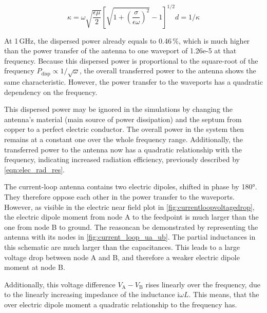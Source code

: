 \begin{subequations}
	\begin{equation}
		\kappa = \omega \sqrt{\frac{\epsilon \mu}{2}}\left[\sqrt{ 1+\left(\frac{\sigma}{\epsilon\omega}\right) ^2 } -1\right]^{1/2}
	\label{eqn:kappa}
	\end{equation}
	\begin{equation}
		d = 1/\kappa
	\label{eqn:skin_depth}
	\end{equation}
\end{subequations}

At 1\,GHz, the dispersed power already equals to 0.46\,\%, which is much higher than the power transfer of the antenna to one waveport of 1.26e-5 at that frequency. Because this dispersed power is proportional to the square-root of the frequency $P_\mathrm{disp}\propto 1/\sqrt{\omega}$, the overall transferred power to the antenna shows the same characteristic. However, the power transfer to the waveports has a quadratic dependency on the frequency. %

This dispersed power may be ignored in the simulations by changing the antenna's material (main source of power dissipation) and the septum from copper to a perfect electric conductor. The overall power in the system then remains at a constant one over the whole frequency range. Additionally, the transferred power to the antenna now has a quadratic relationship with the frequency, indicating increased radiation efficiency, previously described by \autoref{eqn:elec_rad_res}. 


The current-loop antenna contains two electric dipoles, shifted in phase by 180°. They therefore oppose each other in the power transfer to the waveports. However, as visible in the electric near field plot in \autoref{fig:currentloopvoltagedrop}, the electric dipole moment from node A to the feedpoint is much larger than the one from node B to ground. The reasoncan be demonstrated by representing the antenna with its nodes in \autoref{fig:current_loop_ua_ub}. The partial inductances in this schematic are much larger than the capacitances. This leads to a large voltage drop between node A and B, and therefore a weaker electric dipole moment at node B.

Additionally, this voltage difference $V_\mathrm{A}-V_\mathrm{B}$ rises linearly over the frequency, due to the linearly increasing impedance of the inductance $\mathrm{i}\omega L$. This means, that the over electric dipole moment a quadratic relationship to the frequency has.

